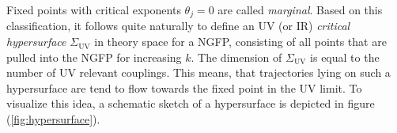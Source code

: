 Fixed points with critical exponents $\theta_{j}=0$ are called \textit{marginal}. Based on this classification, it follows quite naturally to define an UV (or IR)  \textit{critical hypersurface} $\Sigma_{\mathrm{UV}}$ in theory space for a NGFP, consisting of all points that are pulled into the NGFP for increasing $k$. The dimension of $\Sigma_{\mathrm{UV}}$ is equal to the number of UV relevant couplings. This means, that trajectories lying on such a hypersurface are tend to flow towards the fixed point in the UV limit. To visualize this idea, a schematic sketch of a hypersurface is depicted in figure (\ref{fig:hypersurface}).